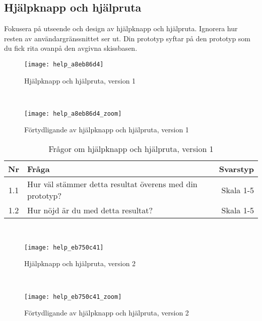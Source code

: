 \subsection{Hjälpknapp och hjälpruta}
Fokusera på utseende och design av hjälpknapp och hjälpruta. Ignorera hur resten av användargränssnittet ser ut.
Din prototyp syftar på den prototyp som du fick rita ovanpå den avgivna skissbasen.

\begin{figure}[H]
  \centering
  \texttt{[image: help\_a8eb86d4]}
  \label{fig:help_1}
  \caption{Hjälpknapp och hjälpruta, version 1}
\end{figure}
\ 

\begin{figure}[H]
  \centering
  \texttt{[image: help\_a8eb86d4\_zoom]}
  \label{fig:help_1_zoom}
  \caption{Förtydligande av hjälpknapp och hjälpruta, version 1}
\end{figure}

\begin{table}[h!]
  \caption{Frågor om hjälpknapp och hjälpruta, version 1}
  \def\arraystretch{1.5}
  \begin{adjustbox}{max width=\textwidth}
    \begin{tabularx}{\textwidth}{ | c | X | r |}
      \hline
      \textbf{Nr} & \textbf{Fråga} & \textbf{Svarstyp} \\
      \hline
      1.1 & Hur väl stämmer detta resultat överens med din prototyp? & Skala 1-5 \\
      \hline
      1.2 & Hur nöjd är du med detta resultat? & Skala 1-5 \\
      \hline 
    \end{tabularx}
  \end{adjustbox}
  \label{tab:prototyp_enkat_help_1}
\end{table}
\ 

\begin{figure}[H]
  \centering
  \texttt{[image: help\_eb750c41]}
  \label{fig:help_2}
  \caption{Hjälpknapp och hjälpruta, version 2}
\end{figure}
\ 

\begin{figure}[H]
  \centering
  \texttt{[image: help\_eb750c41\_zoom]}
  \label{fig:help_2_zoom}
  \caption{Förtydligande av hjälpknapp och hjälpruta, version 2}
\end{figure}
\ 

